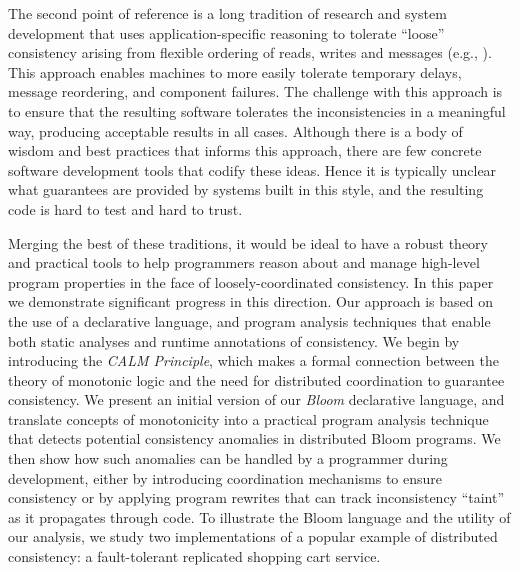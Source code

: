 The second point of reference is a long tradition of research and system development that uses application-specific reasoning to tolerate ``loose'' consistency arising from flexible ordering of reads, writes and messages (e.g., \cite{sagas,helland2007life,quicksand,base}). This approach enables machines to more easily tolerate temporary delays, message reordering, and component failures.  
The challenge with this approach is to ensure that the resulting software tolerates the inconsistencies in a meaningful way, producing acceptable results in all cases.  Although there is a body of wisdom and best practices that informs this approach, there are few concrete software development tools that codify these ideas.  Hence it is typically unclear what guarantees are provided by systems built in this style, and the resulting code is hard to test and hard to trust.  

Merging the best of these traditions, it would be ideal to have a robust theory and practical tools to  help programmers reason about and manage high-level program properties in the face of loosely-coordinated consistency.  In this paper we demonstrate significant progress in this direction.  Our approach is based on the use of a declarative language, and program analysis techniques that enable both static analyses and runtime annotations of consistency.  We begin by introducing the \emph{CALM Principle}, which makes a formal connection between the theory of monotonic logic and the need for distributed coordination to guarantee consistency.  We present an initial version of our {\em Bloom} declarative language, and translate concepts of monotonicity into a practical program analysis technique that detects potential consistency anomalies in distributed Bloom programs.  We then show how such anomalies can be handled by a programmer during development, either by introducing coordination mechanisms to ensure consistency or by applying program rewrites that can track inconsistency ``taint'' as it propagates through code.  To illustrate the Bloom language and the utility of our analysis, we study two implementations of a popular example of distributed consistency: a fault-tolerant replicated shopping cart service.  


